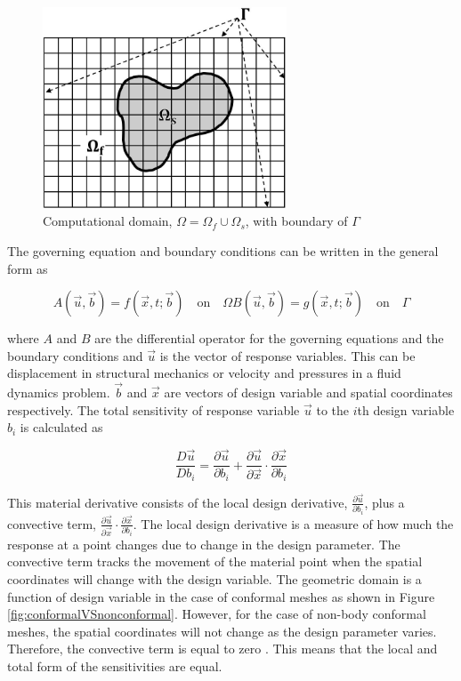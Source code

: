 \documentclass[12pt]{aiaa-pretty}
\begin{document}
%
\begin{figure}[H]
	\centering
	\includegraphics[height=6.0cm]{figure/domain.jpg}
	\caption{Computational domain, $\Omega = \Omega_f \cup \Omega_s$, with boundary of $\Gamma$}
	\label{fig:domain}
\end{figure}
%

The governing equation and boundary conditions can be written in the general form as

%
\begin{subequations}\label{eq:generalFormForGE}
\begin{equation}
	A(\vec{u}, \vec{b}) = f(\vec{x}, t; \vec{b}) \quad \text{on} \quad \Omega
\end{equation}
\begin{equation}
	B(\vec{u}, \vec{b}) = g(\vec{x}, t; \vec{b}) \quad \text{on} \quad \Gamma
\end{equation}
\end{subequations}
%

where $A$ and $B$ are the differential operator for the governing equations and the boundary conditions and $\vec{u}$ is the vector of response variables. This can be displacement in structural mechanics or velocity and pressures in a fluid dynamics problem. $\vec{b}$ and $\vec{x}$ are vectors of design variable and spatial coordinates respectively. The total sensitivity of response variable $\vec{u}$ to the $i$th design variable $b_i$ is calculated as

%
\begin{equation}
	\frac{D\vec{u}}{Db_i	} = \frac{\partial \vec{u}}{\partial b_i} + 
	                        \frac{\partial \vec{u}}{\partial \vec{x}} \cdot \frac{\partial \vec{x}}{\partial b_i}
\end{equation}
%

This material derivative consists of the local design derivative, $\frac{\partial \vec{u}}{\partial b_i}$, plus a convective term, $\frac{\partial \vec{u}}{\partial \vec{x}} \cdot \frac{\partial \vec{x}}{\partial b_i}$. The local design derivative is a measure of how much the response at a point changes due to change in the design parameter. The convective term tracks the movement of the material point when the spatial coordinates will change with the design variable. The geometric domain is a function of design variable in the case of conformal meshes as shown in Figure \ref{fig:conformalVSnonconformal}. However, for the case of non-body conformal meshes, the spatial coordinates will not change as the design parameter varies. Therefore, the convective term is equal to zero \cite{gobal2014continuum}. This means that the local and total form of the sensitivities are equal.
\end{document}
